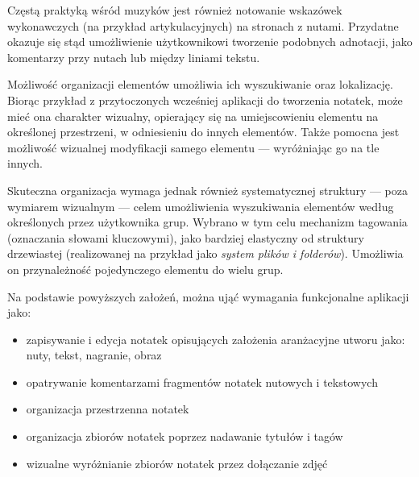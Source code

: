 Częstą praktyką wśród muzyków jest również notowanie wskazówek wykonawczych (na przykład artykulacyjnych)
na stronach z nutami.
Przydatne okazuje się stąd umożliwienie użytkownikowi tworzenie podobnych adnotacji, jako komentarzy przy nutach
lub między liniami tekstu.

Możliwość organizacji elementów umożliwia ich wyszukiwanie oraz lokalizację.
Biorąc przykład z przytoczonych wcześniej aplikacji do tworzenia notatek, może mieć ona charakter wizualny,
opierający się na umiejscowieniu elementu na określonej przestrzeni, w odniesieniu do innych elementów.
Także pomocna jest możliwość wizualnej modyfikacji samego elementu — wyróżniając go na tle innych.

Skuteczna organizacja wymaga jednak również systematycznej struktury — poza wymiarem wizualnym — celem umożliwienia wyszukiwania
elementów według określonych przez użytkownika grup. Wybrano w tym celu mechanizm tagowania (oznaczania słowami kluczowymi), jako bardziej
elastyczny od struktury drzewiastej (realizowanej na przykład jako \textit{system plików i folderów}). Umożliwia on przynależność pojedynczego
elementu do wielu grup.

Na podstawie powyższych założeń, można ująć wymagania funkcjonalne aplikacji jako:
\begin{itemize}
	\item zapisywanie i edycja notatek opisujących założenia aranżacyjne utworu jako: nuty, tekst, nagranie, obraz
	\item opatrywanie komentarzami fragmentów notatek nutowych i tekstowych
	\item organizacja przestrzenna notatek
	\item organizacja zbiorów notatek poprzez nadawanie tytułów i tagów
	\item wizualne wyróżnianie zbiorów notatek przez dołączanie zdjęć
\end{itemize}

